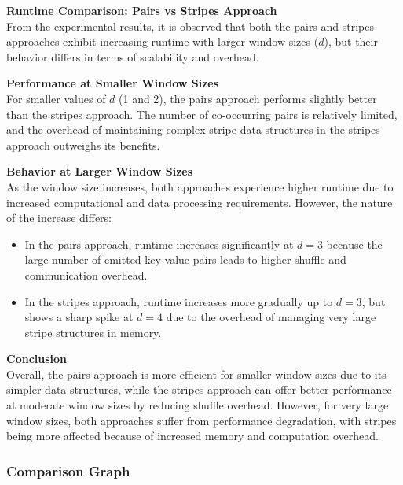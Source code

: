 \documentclass[12pt,a4paper]{article}
\begin{document}
\begin{infobox}
  \textbf{Runtime Comparison: Pairs vs Stripes Approach} \\
  From the experimental results, it is observed that both the pairs and stripes approaches exhibit increasing runtime with larger window sizes ($d$), but their behavior differs in terms of scalability and overhead.
  \vspace{0.5em}
  
  \textbf{Performance at Smaller Window Sizes} \\
  For smaller values of $d$ (1 and 2), the pairs approach performs slightly better than the stripes approach. The number of co-occurring pairs is relatively limited, and the overhead of maintaining complex stripe data structures in the stripes approach outweighs its benefits.
  \vspace{0.5em}
  
  \textbf{Behavior at Larger Window Sizes} \\
  As the window size increases, both approaches experience higher runtime due to increased computational and data processing requirements. However, the nature of the increase differs:
  \begin{itemize}
    \item In the pairs approach, runtime increases significantly at $d = 3$ because the large number of emitted key-value pairs leads to higher shuffle and communication overhead.
    \item In the stripes approach, runtime increases more gradually up to $d = 3$, but shows a sharp spike at $d = 4$ due to the overhead of managing very large stripe structures in memory.
  \end{itemize}
  \vspace{0.5em}
  
  \textbf{Conclusion} \\
  Overall, the pairs approach is more efficient for smaller window sizes due to its simpler data structures, while the stripes approach can offer better performance at moderate window sizes by reducing shuffle overhead. However, for very large window sizes, both approaches suffer from performance degradation, with stripes being more affected because of increased memory and computation overhead.
\end{infobox}

\subsubsection{Comparison Graph}
\end{document}
